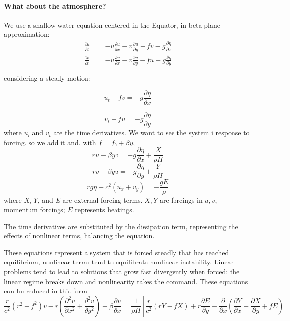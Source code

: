 \paragraph{What about the atmosphere?}
We use a shallow water equation centered in the Equator, in beta plane approximation: 
\[\begin{aligned}
\frac{\partial u}{\partial t} &= -u \frac{\partial u}{\partial x} -v \frac{\partial u}{\partial y} + f v -g\frac{\partial \eta}{\partial x} \\
\frac{\partial v}{\partial t} &= -u \frac{\partial v}{\partial x} -v \frac{\partial v}{\partial y} - f u -g\frac{\partial \eta}{\partial y}  \\
\\
\end{aligned}\]
considering a steady motion:

\begin{equation}
    u_t- fv = -g \frac{\partial \eta}{\partial x}
\end{equation}

\begin{equation}
    v_t + fu = -g \frac{\partial \eta}{\partial y}
\end{equation}
where $u_t$ and $v_t$ are the time derivatives.
We want to see the system i response to forcing, so we add it and, with $f=f_0+\beta y$, 
    $$ru-\beta y v = -g \frac{\partial \eta}{\partial x} + \frac{X}{\rho H}$$
    $$rv+\beta y u = -g \frac{\partial \eta}{\partial y} + \frac{Y}{\rho H}$$
    $$rg\eta+c^2 (u_x + v_y) = -\frac{gE}{\rho}$$
    where $X$, $Y$, and $E$ are external forcing terms. $X,Y$ are forcings in $u,v$, momentum forcings; $E$ represents heatings.

The time derivatives are substituted by the dissipation term, representing the effects of nonlinear terms, balancing the equation.


 These equations represent a system that is forced steadly that has reached equilibrium, nonlinear terms tend to equilibrate nonlinear instability. Linear problems tend to lead to solutions that grow fast divergently when forced: the linear regime breaks down and nonlinearity takes the command. 
 These equations can be reduced in this form 
 \begin{equation}\label{2.11}
     \frac{r}{c^2} \left( r^2 + f^2 \right) v - r \left( \frac{\partial^2 v}{\partial x^2} + \frac{\partial^2 v}{\partial y^2} \right) - \beta \frac{\partial v}{\partial x}
= \frac{1}{\rho H}\left[ \frac{r}{c^2} \left( rY - fX \right) + r \frac{\partial E}{\partial y} - \frac{\partial}{\partial x} \left( \frac{\partial Y}{\partial x} - \frac{\partial X}{\partial y} + fE \right)\right]
 \end{equation}
 
